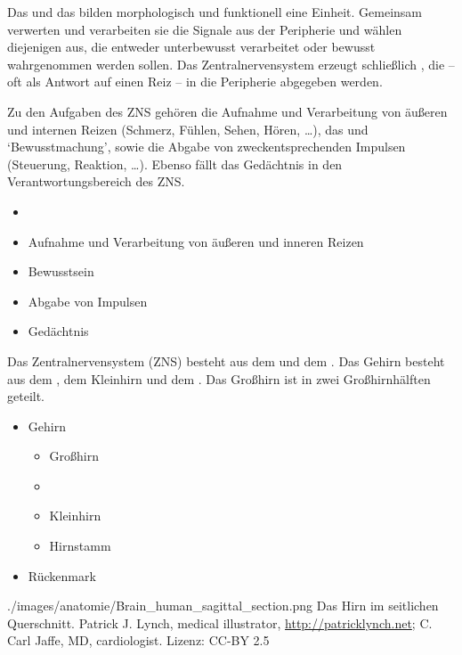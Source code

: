 {\TxBeschreibung}
{Das  und das  bilden
morphologisch
und funktionell eine Einheit. Gemeinsam verwerten und
verarbeiten sie die Signale aus der Peripherie und wählen
diejenigen aus, die entweder unterbewusst verarbeitet oder
bewusst wahrgenommen werden sollen. Das Zentralnervensystem
erzeugt schließlich , die -- oft als Antwort auf
einen Reiz -- in die Peripherie abgegeben werden.

Zu den Aufgaben des ZNS gehören die Aufnahme  und Verarbeitung  von äußeren und
    internen  Reizen
    (Schmerz, Fühlen, Sehen, Hören, {\dots}), das
 und
    \enquote*{Bewusstmachung}, sowie die  Abgabe  von zweckentsprechenden Impulsen
    (Steuerung, Reaktion, {\dots}). Ebenso fällt das Gedächtnis 
    in den Verantwortungsbereich des ZNS.
}
{\begin{itemize}
  \item 
    \item Aufnahme  und Verarbeitung  von äußeren und
    inneren  Reizen
    \item Bewusstsein 
    \item Abgabe  von Impulsen
    \item Gedächtnis
\end{itemize}}
{}
{}
{}



{%
Das Zentralnervensystem (ZNS) besteht aus dem 
und dem . 
Das Gehirn besteht aus dem
,  dem Kleinhirn und dem
. Das Großhirn ist in zwei Großhirnhälften
geteilt.

\bigskip

\bigskip

\bigskip

\bigskip
}
{
\begin{itemize}
    \item Gehirn
    \begin{itemize}
        \item Großhirn
        \item {}
        \item {Kleinhirn}
        \item Hirnstamm
    \end{itemize}
    \item Rückenmark
\end{itemize}
}
{./images/anatomie/Brain_human_sagittal_section.png}
{Das Hirn im seitlichen Querschnitt.}
{Patrick J. Lynch, medical illustrator,
\url{http://patricklynch.net}; C. Carl Jaffe, MD,
cardiologist. Lizenz: CC-BY 2.5}



